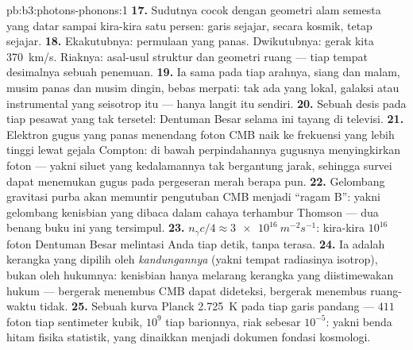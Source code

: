 \begin{solution}{pb:b3:photons-phonons:1}
\textbf{17.} Sudutnya cocok dengan geometri alam semesta yang datar
sampai kira-kira satu persen: garis sejajar, secara kosmik, tetap sejajar.
\textbf{18.} Ekakutubnya: permulaan yang panas. Dwikutubnya: gerak kita
\qty{370}{km/s}. Riaknya: asal-usul struktur dan geometri ruang ---
tiap tempat desimalnya sebuah penemuan.
\textbf{19.} Ia sama pada tiap arahnya, siang dan malam, musim panas
dan musim dingin, bebas merpati: tak ada yang lokal, galaksi atau
instrumental yang seisotrop itu --- hanya langit itu sendiri.
\textbf{20.} Sebuah desis pada tiap pesawat yang tak tersetel: Dentuman
Besar selama ini tayang di televisi.
\textbf{21.} Elektron gugus yang panas menendang foton CMB naik ke
frekuensi yang lebih tinggi lewat gejala Compton: di bawah
perpindahannya gugusnya menyingkirkan foton --- yakni siluet yang
kedalamannya tak bergantung jarak, sehingga survei dapat menemukan gugus
pada pergeseran merah berapa pun.
\textbf{22.} Gelombang gravitasi purba akan memuntir pengutuban
CMB menjadi ``ragam B'': yakni gelombang kenisbian yang dibaca dalam
cahaya terhambur Thomson --- dua benang buku ini yang tersimpul.
\textbf{23.} $n_\gamma c/4 \approx \qty{3e16}{m^{-2}s^{-1}}$:
kira-kira $10^{16}$ foton Dentuman Besar melintasi Anda tiap detik,
tanpa terasa.
\textbf{24.} Ia adalah kerangka yang dipilih oleh \emph{kandungannya}
(yakni tempat radiasinya isotrop), bukan oleh hukumnya: kenisbian hanya
melarang kerangka yang diistimewakan hukum --- bergerak menembus CMB
dapat dideteksi, bergerak menembus ruang-waktu tidak.
\textbf{25.} Sebuah kurva Planck \qty{2.725}{K} pada tiap garis pandang
--- $411$ foton tiap sentimeter kubik, $10^9$ tiap barionnya,
riak sebesar $10^{-5}$: yakni benda hitam fisika statistik, yang
dinaikkan menjadi dokumen fondasi kosmologi.
\end{solution}
